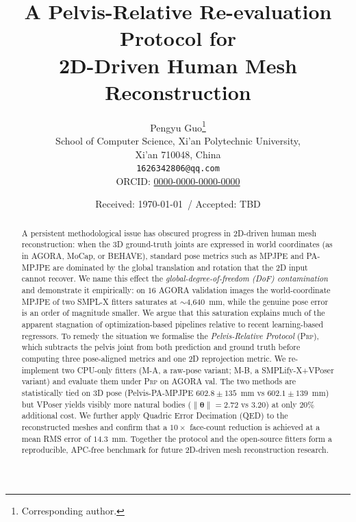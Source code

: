 \documentclass[twocolumn,10pt]{svjour3}
\newcommand{\methodA}{\textsc{M-A}}
\newcommand{\methodB}{\textsc{M-B}}
\newcommand{\prp}{\textsc{Prp}}
\begin{document}
\title{A Pelvis-Relative Re-evaluation Protocol for \\ 2D-Driven Human Mesh Reconstruction}

\author{
  Pengyu Guo\thanks{Corresponding author.} \\
  \small School of Computer Science, Xi'an Polytechnic University,\\
  \small Xi'an 710048, China \\
  \small \texttt{1626342806@qq.com} \\
  \small ORCID: \href{https://orcid.org/0000-0000-0000-0000}{0000-0000-0000-0000}
}

\date{Received: \today\ / Accepted: TBD}

\maketitle

\begin{abstract}
A persistent methodological issue has obscured progress in 2D-driven human mesh reconstruction: when the 3D ground-truth joints are expressed in world coordinates (as in AGORA, MoCap, or BEHAVE), standard pose metrics such as MPJPE and PA-MPJPE are dominated by the global translation and rotation that the 2D input cannot recover. We name this effect the \emph{global-degree-of-freedom (DoF) contamination} and demonstrate it empirically: on $16$ AGORA validation images the world-coordinate MPJPE of two SMPL-X fitters saturates at $\sim$4{,}640~mm, while the genuine pose error is an order of magnitude smaller. We argue that this saturation explains much of the apparent stagnation of optimization-based pipelines relative to recent learning-based regressors. To remedy the situation we formalise the \emph{Pelvis-Relative Protocol} (\prp), which subtracts the pelvis joint from both prediction and ground truth before computing three pose-aligned metrics and one 2D reprojection metric. We re-implement two CPU-only fitters (\methodA{}, a raw-pose variant; \methodB{}, a SMPLify-X+VPoser variant) and evaluate them under \prp{} on AGORA val. The two methods are statistically tied on 3D pose (Pelvis-PA-MPJPE $602.8 \pm 135$~mm vs $602.1 \pm 139$~mm) but VPoser yields visibly more natural bodies ($\|\boldsymbol{\theta}\|=2.72$ vs $3.20$) at only $20\%$ additional cost. We further apply Quadric Error Decimation (QED) to the reconstructed meshes and confirm that a $10\times$ face-count reduction is achieved at a mean RMS error of $14.3$~mm. Together the protocol and the open-source fitters form a reproducible, APC-free benchmark for future 2D-driven mesh reconstruction research.
\end{abstract}
\end{document}
